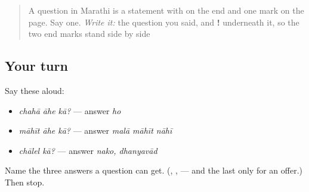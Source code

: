 \begin{quote}
A question in Marathi is a statement with \textbf{} on the end and one mark on the page. Say one. \emph{Write it:} the question you said, and \textbf{!} underneath it, so the two end marks stand side by side
\end{quote}

\subsection*{Your turn}
Say these aloud:

\begin{itemize}
\raggedright
  \item \emph{chahā āhe kā?} — answer \emph{ho}
  \item \emph{māhīt āhe kā?} — answer \emph{malā māhīt nāhī}
  \item \emph{chālel kā?} — answer \emph{nako, dhanyavād}
\end{itemize}

\begin{tcolorbox}[breakable,colback=teal!4,colframe=teal!35!black,title={Before you move on}]
Name the three answers a \textbf{} question can get. (\textbf{}, \textbf{}, \textbf{} — and the last only for an offer.) Then stop.
\end{tcolorbox}
